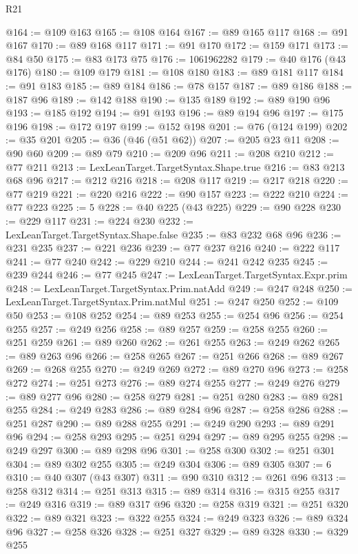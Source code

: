 \begin{lexlean}{R21}
\begin{coremodule}
@164 := @109 @163
@165 := @108 @164
@167 := @89 @165 @117
@168 := @91 @167
@170 := @89 @168 @117
@171 := @91 @170
@172 := @159 @171
@173 := @84 @50
@175 := @83 @173 @75
@176 := 1061962282
@179 := @40 @176 (@43 @176)
@180 := @109 @179
@181 := @108 @180
@183 := @89 @181 @117
@184 := @91 @183
@185 := @89 @184
@186 := @78 @157
@187 := @89 @186
@188 := @187 @96
@189 := @142 @188
@190 := @135 @189
@192 := @89 @190 @96
@193 := @185 @192
@194 := @91 @193
@196 := @89 @194 @96
@197 := @175 @196
@198 := @172 @197
@199 := @152 @198
@201 := @76 (@124 @199)
@202 := @35 @201
@205 := @36 (@46 (@51 @62))
@207 := @205 @23 @11
@208 := @90 @60
@209 := @89 @79
@210 := @209 @96
@211 := @208 @210
@212 := @77 @211
@213 := LexLeanTarget.TargetSyntax.Shape.true
@216 := @83 @213 @68 @96
@217 := @212 @216
@218 := @208 @117
@219 := @217 @218
@220 := @77 @219
@221 := @220 @216
@222 := @90 @157
@223 := @222 @210
@224 := @77 @223
@225 := 5
@228 := @40 @225 (@43 @225)
@229 := @90 @228
@230 := @229 @117
@231 := @224 @230
@232 := LexLeanTarget.TargetSyntax.Shape.false
@235 := @83 @232 @68 @96
@236 := @231 @235
@237 := @221 @236
@239 := @77 @237 @216
@240 := @222 @117
@241 := @77 @240
@242 := @229 @210
@244 := @241 @242 @235
@245 := @239 @244
@246 := @77 @245
@247 := LexLeanTarget.TargetSyntax.Expr.prim
@248 := LexLeanTarget.TargetSyntax.Prim.natAdd
@249 := @247 @248
@250 := LexLeanTarget.TargetSyntax.Prim.natMul
@251 := @247 @250
@252 := @109 @50
@253 := @108 @252
@254 := @89 @253
@255 := @254 @96
@256 := @254 @255
@257 := @249 @256
@258 := @89 @257
@259 := @258 @255
@260 := @251 @259
@261 := @89 @260
@262 := @261 @255
@263 := @249 @262
@265 := @89 @263 @96
@266 := @258 @265
@267 := @251 @266
@268 := @89 @267
@269 := @268 @255
@270 := @249 @269
@272 := @89 @270 @96
@273 := @258 @272
@274 := @251 @273
@276 := @89 @274 @255
@277 := @249 @276
@279 := @89 @277 @96
@280 := @258 @279
@281 := @251 @280
@283 := @89 @281 @255
@284 := @249 @283
@286 := @89 @284 @96
@287 := @258 @286
@288 := @251 @287
@290 := @89 @288 @255
@291 := @249 @290
@293 := @89 @291 @96
@294 := @258 @293
@295 := @251 @294
@297 := @89 @295 @255
@298 := @249 @297
@300 := @89 @298 @96
@301 := @258 @300
@302 := @251 @301
@304 := @89 @302 @255
@305 := @249 @304
@306 := @89 @305
@307 := 6
@310 := @40 @307 (@43 @307)
@311 := @90 @310
@312 := @261 @96
@313 := @258 @312
@314 := @251 @313
@315 := @89 @314
@316 := @315 @255
@317 := @249 @316
@319 := @89 @317 @96
@320 := @258 @319
@321 := @251 @320
@322 := @89 @321
@323 := @322 @255
@324 := @249 @323
@326 := @89 @324 @96
@327 := @258 @326
@328 := @251 @327
@329 := @89 @328
@330 := @329 @255

\end{coremodule}
\end{lexlean}

